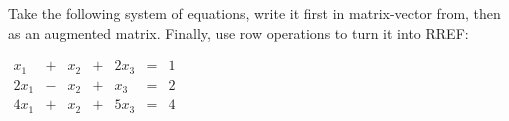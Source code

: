 \documentclass{article}
\begin{document}
\begin{flushleft}
Take the following system of equations, write it first in matrix-vector from, then as an augmented matrix. Finally, use row operations to turn it into RREF:

\begin{center}
$\begin{array}{rrrrrrr}
x_1 & + & x_2 & + & 2 x_3 & = & 1\\
2 x_1 & - & x_2 & + & x_3 & = & 2\\
4 x_1 & + & x_2 & + & 5 x_3 & = & 4
\end{array}$
\end{center}

\end{flushleft}
\end{document}
